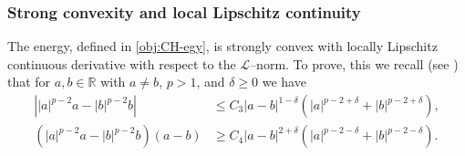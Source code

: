 \documentclass{amsart}
\newcommand{\Hm}{{\mathring H_{\mathrm{per}}^{-1}}}
\newcommand{\Homz}{{\mathring{H}_{\mathrm{per}}^{1}}}
\newcommand{\nlapi}{{(-\Delta)^{-1}}}
\newcommand{\calB}{{\mathcal{B}}}
\newcommand{\LL}{\mathcal{L}}
\newcommand{\LLinv}{{\mathcal{L}^{-1}}}
\newcommand{\norm}[2]{\left\| #1 \right\| _{#2}}
\newcommand{\pairing}[2]{\bigl\langle #1 , #2 \bigr\rangle}
\newcommand{\RR}{\mathbb{R}}
\theoremstyle{definition}
\newtheorem{prop}[thm]{Proposition}
\begin{document}
%

\subsubsection{Strong convexity and local Lipschitz continuity}
The energy, defined in \eqref{obj:CH-egy}, is strongly convex with locally Lipschitz continuous derivative with respect to the $\LL$--norm. To prove, this we recall (see \cite{liu1993plap}) that for $a,b\in \RR$ with $a\neq b$, $p>1$, and $\delta\ge0$ we have
\begin{align}
	\left| |a|^{p-2}a - |b|^{p-2}b\right| &\le C_3 \left| a-b\right|^{1-\delta}\left(|a|^{p-2+\delta}+|b|^{p-2+\delta} \right),
	\label{est:p-diff}
	\\
	\left( |a|^{p-2}a - |b|^{p-2}b\right)\left( a-b\right) &\ge C_4 \left| a-b\right|^{2+\delta}\left(|a|^{p-2-\delta}+|b|^{p-2-\delta} \right).
	\label{est:p-diff-ip}
\end{align}
\end{document}
